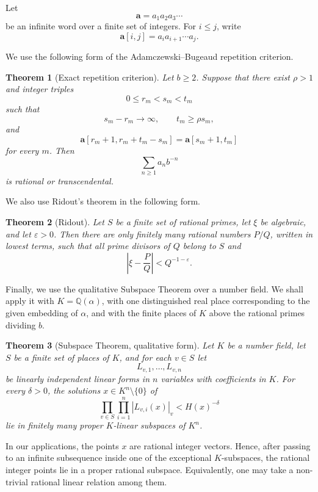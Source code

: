 \documentclass[11pt]{amsart}
\newtheorem{theorem}{Theorem}[section]
\begin{document}
Let
\[
\mathbf a=a_1a_2a_3\cdots
\]
be an infinite word over a finite set of integers. For \(i\leq j\), write
\[
\mathbf a[i,j]=a_i a_{i+1}\cdots a_j.
\]

We use the following form of the Adamczewski--Bugeaud repetition criterion.

\begin{theorem}[Exact repetition criterion]
Let \(b\geq 2\). Suppose that there exist \(\rho>1\) and integer triples
\[
0\leq r_m<s_m<t_m
\]
such that
\[
s_m-r_m\to\infty,
\qquad
t_m\geq \rho s_m,
\]
and
\[
\mathbf a[r_m+1,r_m+t_m-s_m]
=
\mathbf a[s_m+1,t_m]
\]
for every \(m\). Then
\[
\sum_{n\geq 1}a_n b^{-n}
\]
is rational or transcendental.
\end{theorem}

We also use Ridout's theorem in the following form.

\begin{theorem}[Ridout]
Let \(S\) be a finite set of rational primes, let \(\xi\) be algebraic, and let \(\varepsilon>0\). Then there are only finitely many rational numbers \(P/Q\), written in lowest terms, such that all prime divisors of \(Q\) belong to \(S\) and
\[
\left|\xi-\frac{P}{Q}\right|<Q^{-1-\varepsilon}.
\]
\end{theorem}

Finally, we use the qualitative Subspace Theorem over a number field. We shall apply it with \(K=\mathbb Q(\alpha)\), with one distinguished real place corresponding to the given embedding of \(\alpha\), and with the finite places of \(K\) above the rational primes dividing \(b\).

\begin{theorem}[Subspace Theorem, qualitative form]
Let \(K\) be a number field, let \(S\) be a finite set of places of \(K\), and for each \(v\in S\) let
\[
L_{v,1},\ldots,L_{v,n}
\]
be linearly independent linear forms in \(n\) variables with coefficients in \(K\). For every \(\delta>0\), the solutions \(x\in K^n\setminus\{0\}\) of
\[
\prod_{v\in S}\prod_{i=1}^n |L_{v,i}(x)|_v
<
H(x)^{-\delta}
\]
lie in finitely many proper \(K\)-linear subspaces of \(K^n\).
\end{theorem}

In our applications, the points \(x\) are rational integer vectors. Hence, after passing to an infinite subsequence inside one of the exceptional \(K\)-subspaces, the rational integer points lie in a proper rational subspace. Equivalently, one may take a non-trivial rational linear relation among them.
\end{document}
